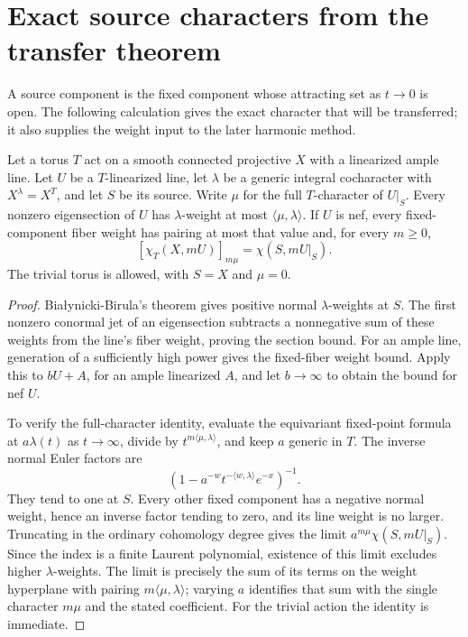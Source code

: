 \section{Exact source characters from the transfer theorem}
\label{inj:extremal-weights}

A source component is the fixed component whose attracting set as $t\to0$ is open. The following calculation gives the exact character that will be transferred; it also supplies the weight input to the later harmonic method.

\begin{lemma}\label{lem:source-character}
Let a torus $T$ act on a smooth connected projective $X$ with a linearized ample line. Let $U$ be a $T$-linearized line, let $\lambda$ be a generic integral cocharacter with $X^\lambda=X^T$, and let $S$ be its source. Write $\mu$ for the full $T$-character of $U|_S$. Every nonzero eigensection of $U$ has $\lambda$-weight at most $\langle\mu,\lambda\rangle$. If $U$ is nef, every fixed-component fiber weight has pairing at most that value and, for every $m\ge0$,
\begin{equation}\label{inj:extreme-index}
 [\chi_T(X,mU)]_{m\mu}=\chi(S,mU|_S).
\end{equation}
The trivial torus is allowed, with $S=X$ and $\mu=0$.
\end{lemma}
\begin{proof}
Bia\l ynicki-Birula's theorem \cite{BB1973} gives positive normal $\lambda$-weights at $S$. The first nonzero conormal jet of an eigensection subtracts a nonnegative sum of these weights from the line's fiber weight, proving the section bound. For an ample line, generation of a sufficiently high power gives the fixed-fiber weight bound. Apply this to $bU+A$, for an ample linearized $A$, and let $b\to\infty$ to obtain the bound for nef $U$.

To verify the full-character identity, evaluate the equivariant fixed-point formula \cite{AtiyahSegal1968,AtiyahSinger1968} at $a\lambda(t)$ as $t\to\infty$, divide by $t^{m\langle\mu,\lambda\rangle}$, and keep $a$ generic in $T$. The inverse normal Euler factors are
\[
 (1-a^{-w}t^{-\langle w,\lambda\rangle}e^{-x})^{-1}.
\]
They tend to one at $S$. Every other fixed component has a negative normal weight, hence an inverse factor tending to zero, and its line weight is no larger. Truncating in the ordinary cohomology degree gives the limit $a^{m\mu}\chi(S,mU|_S)$. Since the index is a finite Laurent polynomial, existence of this limit excludes higher $\lambda$-weights. The limit is precisely the sum of its terms on the weight hyperplane with pairing $m\langle\mu,\lambda\rangle$; varying $a$ identifies that sum with the single character $m\mu$ and the stated coefficient. For the trivial action the identity is immediate.
\end{proof}

